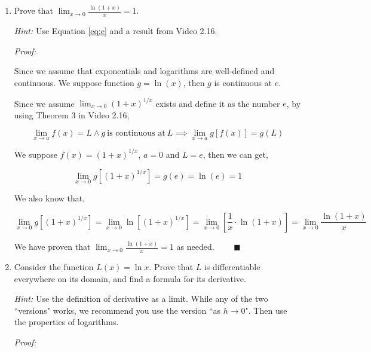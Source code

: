 \documentclass[12pt]{exam}
\newcommand {\DS} [1] {${\displaystyle #1}$}
\newcommand{\vv}{\vspace{.1cm}}
\begin{document}
\begin{enumerate}
	\begin{enumerate}
		\item  Prove that \DS{\lim_{x \to 0} \frac{\ln (1+x)}{x} = 1}.
		
			\emph{Hint:}  Use Equation \eqref{eq:e} and a result from Video 2.16.
		\vv
		
        \emph{Proof:}
        
        \vv
        
        Since we assume that exponentials and logarithms are well-defined and continuous. We suppose function $g=\ln(x)$, then $g$ is continuous at $e$.
        
        Since we assume $\lim_{x \to 0} \left( 1 + x \right)^{1/x}$ exists and define it as the number $e$, by using Theorem 3 in Video 2.16,
        
        $$
            \lim_{x \to a}f(x)=L \land {g\ \mbox{is continuous at}\ L} \implies \lim_{x \to a}g[f(x)]=g(L)
        $$
        
        We suppose $f(x)=\left( 1 + x \right)^{1/x}$, $a=0$ and $L=e$, then we can get,
        
        $$
            \lim_{x \to 0} g[\left( 1 + x \right)^{1/x}]=g(e)=\ln(e)=1
        $$
        
        We also know that,
        
        $$
            \lim_{x \to 0} g[\left( 1 + x \right)^{1/x}]=\lim_{x \to 0} \ln[\left( 1 + x \right)^{1/x}]=\lim_{x \to 0} [\frac{1}{x}\cdot\ln(1 + x)]=\lim_{x \to 0}\frac{\ln (1+x)}{x}
        $$
        
        We have proven that \DS{\lim_{x \to 0} \frac{\ln (1+x)}{x} = 1} as needed. $\qquad \blacksquare$

\newpage

		\item  Consider the function $L(x) = \ln x$.  Prove that $L$ is differentiable everywhere on its domain, and find a formula for its derivative.
			
			\emph{Hint:}  Use the definition of derivative as a limit.  While any of the two ``versions" works, we recommend you use the version ``as $h \to 0$".  Then use the properties of logarithms.
		\vv
		
		\emph{Proof:}
		
		\vv
		

\end{enumerate}
\end{enumerate}
\end{document}
